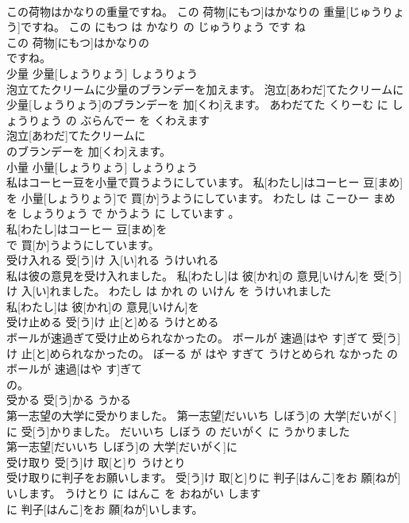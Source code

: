 \documentclass[8pt]{extreport}
\begin{document}
\begin{CJK}{UTF8}{min}
\\	この荷物はかなりの重量ですね。	この 荷物[にもつ]はかなりの 重量[じゅうりょう]ですね。	この にもつ は かなり の じゅうりょう です ね	
\\	この 荷物[にもつ]はかなりの
\\	ですね。			
\\	少量	少量[しょうりょう]	しょうりょう	
\\	泡立てたクリームに少量のブランデーを加えます。	泡立[あわだ]てたクリームに 少量[しょうりょう]のブランデーを 加[くわ]えます。	あわだてた くりーむ に しょうりょう の ぶらんでー を くわえます	
\\	泡立[あわだ]てたクリームに
\\	のブランデーを 加[くわ]えます。			
\\	小量	小量[しょうりょう]	しょうりょう	
\\	私はコーヒー豆を小量で買うようにしています。	私[わたし]はコーヒー 豆[まめ]を 小量[しょうりょう]で 買[か]うようにしています。	わたし は こーひー まめ を しょうりょう で かうよう に しています 。	
\\	私[わたし]はコーヒー 豆[まめ]を
\\	で 買[か]うようにしています。			
\\	受け入れる	受[う]け 入[い]れる	うけいれる	
\\	私は彼の意見を受け入れました。	私[わたし]は 彼[かれ]の 意見[いけん]を 受[う]け 入[い]れました。	わたし は かれ の いけん を うけいれました	
\\	私[わたし]は 彼[かれ]の 意見[いけん]を
\\	受け止める	受[う]け 止[と]める	うけとめる	
\\	ボールが速過ぎて受け止められなかったの。	ボールが 速過[はや す]ぎて 受[う]け 止[と]められなかったの。	ぼーる が はや すぎて うけとめられ なかった の	
\\	ボールが 速過[はや す]ぎて
\\	の。			
\\	受かる	受[う]かる	うかる	
\\	第一志望の大学に受かりました。	第一志望[だいいち しぼう]の 大学[だいがく]に 受[う]かりました。	だいいち しぼう の だいがく に うかりました	
\\	第一志望[だいいち しぼう]の 大学[だいがく]に
\\	受け取り	受[う]け 取[と]り	うけとり	
\\	受け取りに判子をお願いします。	受[う]け 取[と]りに 判子[はんこ]をお 願[ねが]いします。	うけとり に はんこ を おねがい します	
\\	に 判子[はんこ]をお 願[ねが]いします。			

\end{CJK}
\end{document}
